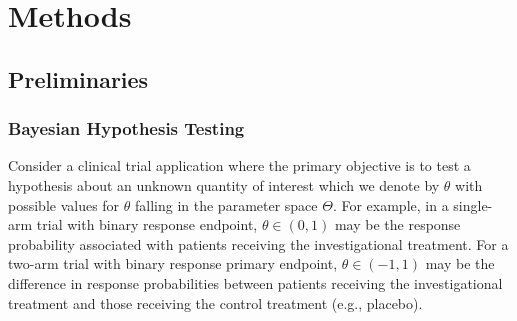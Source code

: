 \documentclass[12pt]{article}
\begin{document}
\section{Methods}\label{sec:methods}

\subsection{Preliminaries}\label{sec:preliminaries}
\subsubsection{Bayesian Hypothesis Testing}
Consider a clinical trial application where the primary objective is to test a hypothesis about an unknown quantity of interest which we denote by $\theta$ with possible values
for $\theta$ falling in the parameter space $\Theta$.
%
For example, in a single-arm trial with binary response endpoint, $\theta \in (0,1)$ may be the response probability associated with patients receiving the investigational treatment.
%
For a two-arm trial with binary response primary endpoint, $\theta \in (-1,1)$ may be the difference in response probabilities between patients receiving the investigational treatment 
and those receiving the control treatment (e.g., placebo).
\end{document}
